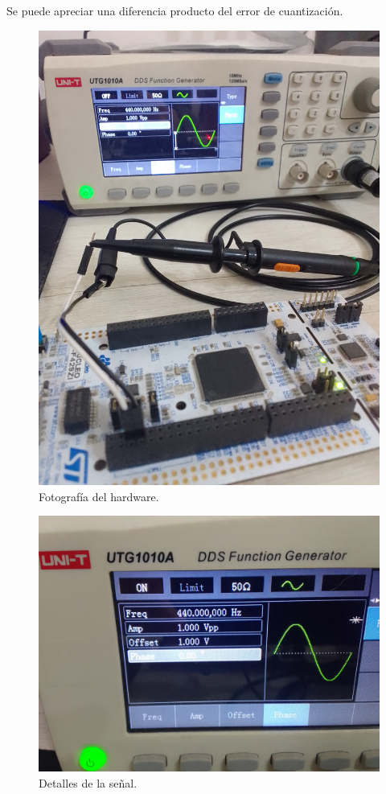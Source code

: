 \documentclass[
    11pt,
    spanish,
	a4paper
]{article}
\begin{document}
Se puede apreciar una diferencia producto del error de cuantización.

\begin{figure}[htbp]
	\centering
	\includegraphics[width=\textwidth]{img/h1.jpg}
	\caption{Fotografía del hardware.}
	\label{fig:h1}
\end{figure}

\begin{figure}[htbp]
	\centering
	\includegraphics[width=\textwidth]{img/h2.jpg}
	\caption{Detalles de la señal.}
	\label{fig:h2}
\end{figure}
\end{document}
